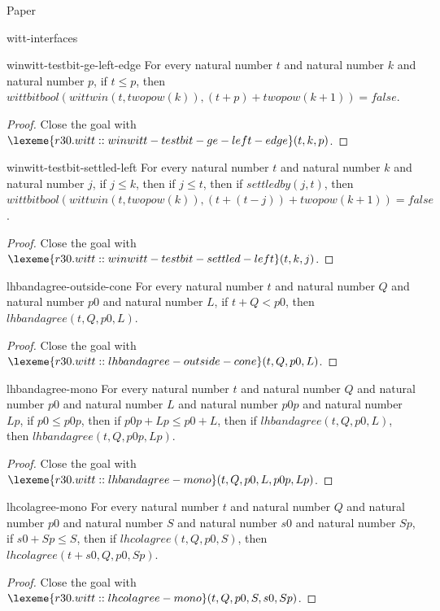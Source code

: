\begin{lexlean}{Paper}
\begin{section}{witt-interfaces}
  \begin{theorem}{winwitt-testbit-ge-left-edge}
  For every natural number \(t\) and natural number \(k\) and natural number \(p\), if \(t ≤ p\), then \(wittbitbool(wittwin(t, twopow(k)), (t + p) + twopow(k + 1)) = false\).
  \begin{proof}
  Close the goal with \(\lexeme{r30.witt::winwitt-testbit-ge-left-edge}(t, k, p)\).
  \end{proof}
  \end{theorem}

  \begin{theorem}{winwitt-testbit-settled-left}
  For every natural number \(t\) and natural number \(k\) and natural number \(j\), if \(j ≤ k\), then if \(j ≤ t\), then if \(settledby(j, t)\), then \(wittbitbool(wittwin(t, twopow(k)), (t + (t - j)) + twopow(k + 1)) = false\).
  \begin{proof}
  Close the goal with \(\lexeme{r30.witt::winwitt-testbit-settled-left}(t, k, j)\).
  \end{proof}
  \end{theorem}

  \begin{theorem}{lhbandagree-outside-cone}
  For every natural number \(t\) and natural number \(Q\) and natural number \(p0\) and natural number \(L\), if \(t + Q < p0\), then \(lhbandagree(t, Q, p0, L)\).
  \begin{proof}
  Close the goal with \(\lexeme{r30.witt::lhbandagree-outside-cone}(t, Q, p0, L)\).
  \end{proof}
  \end{theorem}

  \begin{theorem}{lhbandagree-mono}
  For every natural number \(t\) and natural number \(Q\) and natural number \(p0\) and natural number \(L\) and natural number \(p0p\) and natural number \(Lp\), if \(p0 ≤ p0p\), then if \(p0p + Lp ≤ p0 + L\), then if \(lhbandagree(t, Q, p0, L)\), then \(lhbandagree(t, Q, p0p, Lp)\).
  \begin{proof}
  Close the goal with \(\lexeme{r30.witt::lhbandagree-mono}(t, Q, p0, L, p0p, Lp)\).
  \end{proof}
  \end{theorem}

  \begin{theorem}{lhcolagree-mono}
  For every natural number \(t\) and natural number \(Q\) and natural number \(p0\) and natural number \(S\) and natural number \(s0\) and natural number \(Sp\), if \(s0 + Sp ≤ S\), then if \(lhcolagree(t, Q, p0, S)\), then \(lhcolagree(t + s0, Q, p0, Sp)\).
  \begin{proof}
  Close the goal with \(\lexeme{r30.witt::lhcolagree-mono}(t, Q, p0, S, s0, Sp)\).
  \end{proof}
  \end{theorem}


\end{section}
\end{lexlean}
